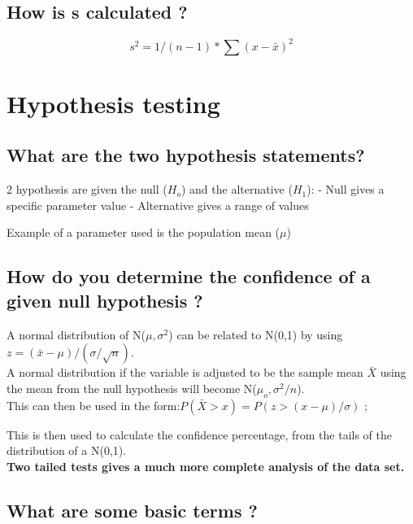 \documentclass[11pt]{scrartcl} %
\begin{document}
\subsection{How is s calculated ?}

\begin{equation}
	s^2 = 1/(n-1) * \sum(x-\bar{x})^2
\end{equation}

\section{Hypothesis testing}

\subsection{What are the two hypothesis
statements?}

2 hypothesis are given the null (\(H_o\)) and the alternative (\(H_1\)):
- Null gives a specific parameter value - Alternative gives a range of
values

Example of a parameter used is the population mean (\(\mu\))

\subsection{How do you determine the confidence of a given null
hypothesis
?}

A normal distribution of N(\(\mu, \sigma^2\)) can be related to N(0,1)
by using \(z = (\bar{x} - \mu)/ (\sigma/\sqrt{n})\).\\

A normal distribution if the variable is adjusted to be the sample mean
\(\bar{X}\) using the mean from the null hypothesis will become
N(\(\mu_o,\sigma^2/n\)).\\

This can then be used in the form:\(P(\bar{X} > x) = P(z > (x-\mu) /\sigma)\) ; 

This is then used to calculate the confidence percentage, from the tails of the distribution
of a N(0,1).\\

\textbf{Two tailed tests gives a much more complete analysis of the data
set.}

\subsection{What are some basic terms
?}
\end{document}
